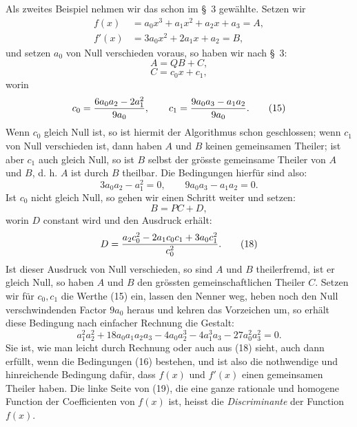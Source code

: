 \documentclass[11pt]{article}
\begin{document}
Als zweites Beispiel nehmen wir das schon im \S~3 gewählte. Setzen wir
\begin{equation}
\begin{aligned}
 f(x)&=a_0x^3+a_1x^2+a_2x+a_3=A,\\
 f'(x)&=3a_0x^2+2a_1x+a_2=B,
\end{aligned}
\tag{12}
\end{equation}
und setzen $a_0$ von Null verschieden voraus, so haben wir nach \S~3:
\begin{equation}
 A=QB+C,
\tag{13}
\end{equation}
\begin{equation}
 C=c_0x+c_1,
\tag{14}
\end{equation}
worin
\begin{equation}
 c_0={6a_0a_2-2a_1^2\over 9a_0},\qquad
 c_1={9a_0a_3-a_1a_2\over 9a_0}.
\tag{15}
\end{equation}
Wenn $c_0$ gleich Null ist, so ist hiermit der Algorithmus schon geschlossen; wenn $c_1$ von Null verschieden ist, dann haben $A$ und $B$ keinen gemeinsamen Theiler; ist aber $c_1$ auch gleich Null, so ist $B$ selbst der grösste gemeinsame Theiler von $A$ und $B$, d. h. $A$ ist durch $B$ theilbar. Die Bedingungen hierfür sind also:
\begin{equation}
 3a_0a_2-a_1^2=0,
 \qquad
 9a_0a_3-a_1a_2=0.
\tag{16}
\end{equation}
Ist $c_0$ nicht gleich Null, so gehen wir einen Schritt weiter und setzen:
\begin{equation}
 B=PC+D,
\tag{17}
\end{equation}
worin $D$ constant wird und den Ausdruck erhält:
\begin{equation}
 D={a_2c_0^2-2a_1c_0c_1+3a_0c_1^2\over c_0^2}.
\tag{18}
\end{equation}
Ist dieser Ausdruck von Null verschieden, so sind $A$ und $B$ theilerfremd, ist er gleich Null, so haben $A$ und $B$ den grössten gemeinschaftlichen Theiler $C$. Setzen wir für $c_0,c_1$ die Werthe (15) ein, lassen den Nenner weg, heben noch den Null verschwindenden Factor $9a_0$ heraus und kehren das Vorzeichen um, so erhält diese Bedingung nach einfacher Rechnung die Gestalt:
\begin{equation}
 a_1^2a_2^2+18a_0a_1a_2a_3-4a_0a_2^3-4a_1^3a_3-27a_0^2a_3^2=0.
\tag{19}
\end{equation}
Sie ist, wie man leicht durch Rechnung oder auch aus (18) sieht, auch dann erfüllt, wenn die Bedingungen (16) bestehen, und ist also die nothwendige und hinreichende Bedingung dafür, dass $f(x)$ und $f'(x)$ einen gemeinsamen Theiler haben. Die linke Seite von (19), die eine ganze rationale und homogene Function der Coefficienten von $f(x)$ ist, heisst die \emph{Discriminante} der Function $f(x)$.
\end{document}
